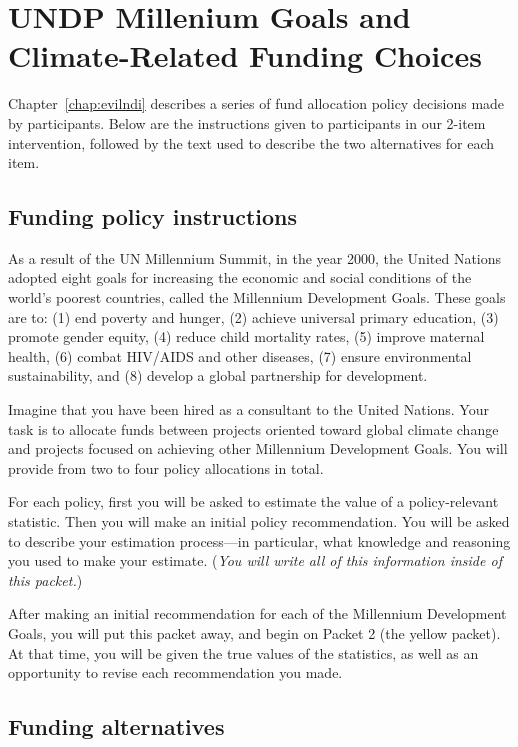 \chapter{UNDP Millenium Goals and Climate-Related Funding Choices}
\label{app:undp}

Chapter~\ref{chap:evilndi} describes a series of fund allocation policy
decisions made by participants. Below are the instructions given to participants
in our 2-item intervention, followed by the text used to describe the two
alternatives for each item.

\section{Funding policy instructions}

As a result of the UN Millennium Summit, in the year 2000, the United Nations
adopted eight goals for increasing the economic and social conditions of the
world’s poorest countries, called the Millennium Development Goals.  These goals
are to: (1) end poverty and hunger, (2) achieve universal primary education, (3)
promote gender equity, (4) reduce child mortality rates, (5) improve maternal
health, (6) combat HIV/AIDS and other diseases, (7) ensure environmental
sustainability, and (8) develop a global partnership for development. 

Imagine that you have been hired as a consultant to the United Nations. Your
task is to allocate funds between projects oriented toward global climate change
and projects focused on achieving other Millennium Development Goals. You will
provide from two to four policy allocations in total. 

For each policy, first you will be asked to estimate the value of a
policy-relevant statistic. Then you will make an initial policy recommendation.
You will be asked to describe your estimation process---in particular, what
knowledge and reasoning you used to make your estimate. (\emph{You will write
    all of this information inside of this packet.})

After making an initial recommendation for each of the Millennium Development
Goals, you will put this packet away, and begin on Packet 2 (the yellow packet).
At that time, you will be given the true values of the statistics, as well as an
opportunity to revise each recommendation you made.

\section{Funding alternatives}

